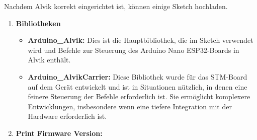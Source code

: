 Nachdem Alvik korrekt eingerichtet ist, können einige Sketch hochladen.
\begin{enumerate}
	\item\textbf{Bibliotheken} 
	\begin{itemize}
		\item\textbf{Arduino\_Alvik:} Dies ist die Hauptbibliothek, die im Sketch verwendet wird und Befehle zur Steuerung des Arduino Nano ESP32-Boards in Alvik enthält.
		\item\textbf{Arduino\_AlvikCarrier:} Diese Bibliothek wurde für das STM-Board auf dem Gerät entwickelt und ist in Situationen nützlich, in denen eine feinere Steuerung der Befehle erforderlich ist. Sie ermöglicht komplexere Entwicklungen, insbesondere wenn eine tiefere Integration mit der Hardware erforderlich ist.
	\end{itemize} 
	\item\textbf{Print Firmware Version:} 
	\begin{itemize}
		

\end{itemize}
\end{enumerate}
